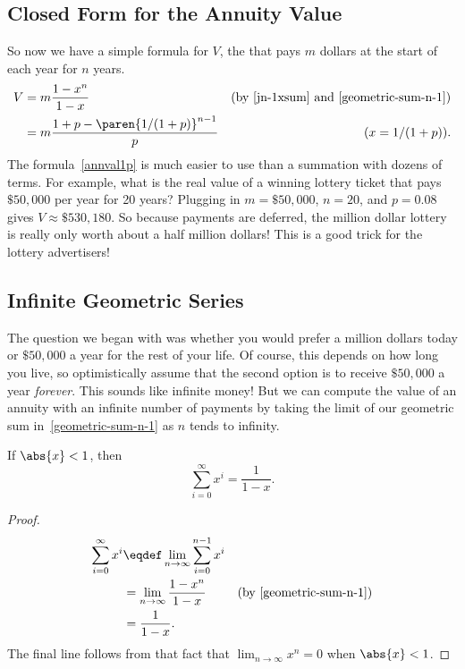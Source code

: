 \subsection{Closed Form for the Annuity Value}
So now we have a simple formula for $V$, the  that pays $m$ dollars at the start of each year for $n$ years.
\begin{align}
  V & = m \frac{1 - x^n}{1-x}
      & \text{(by~\eqref{jn-1xsum} and~\eqref{geometric-sum-n-1})}\label{Vmfrac1x}\\
  & = m \frac{1 + p - \paren{1/(1+p)}^{n-1}}{p}
      & (x = 1/(1+p)).\label{annval1p}
\end{align}
The formula~\eqref{annval1p} is much easier to use than a summation with
dozens of terms.  For example, what is the real value of a winning lottery
ticket that pays $\$50,000$ per year for 20 years?  Plugging in $m =
\$50,000$, $n = 20$, and $p = 0.08$ gives $V \approx \$530,180$.  So
because payments are deferred, the million dollar lottery is really only
worth about a half million dollars!  This is a good trick for the lottery
advertisers!

\subsection{Infinite Geometric Series}

The question we began with was whether you would prefer a million dollars
today or $\$50,000$ a year for the rest of your life.  Of course, this
depends on how long you live, so optimistically assume that the second
option is to receive $\$50,000$ a year \emph{forever}.  This sounds like
infinite money!  But we can compute the value of an annuity with an
infinite number of payments by taking the limit of our geometric sum
in~\eqref{geometric-sum-n-1} as $n$ tends to infinity.
\begin{theorem}\label{th:series}
If $\abs{x} < 1$, then
\[
\sum_{i=0}^\infty x^i = \frac{1}{1-x}.
\]
\end{theorem}

\begin{proof}
\begin{align*}
\sum_{i=0}^\infty x^i
   & \eqdef  \lim_{n \rightarrow \infty} \sum_{i=0}^{n-1} x^i \\
   & = \lim_{n \rightarrow \infty} \frac{1 - x^n}{1-x} & \text{(by~\eqref{geometric-sum-n-1})}\\
   & = \frac{1}{1-x}.  
\end{align*}
The final line follows from that fact that $\lim_{n \rightarrow \infty}
x^n =0$ when $\abs{x} < 1$.
\end{proof}

